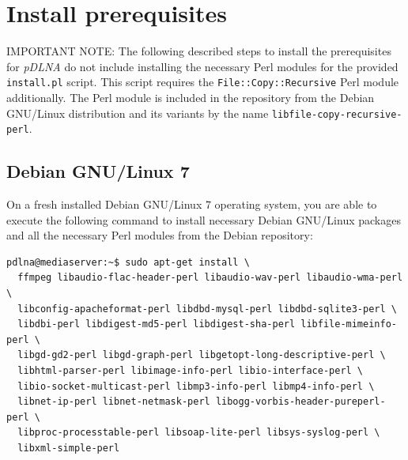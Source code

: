 \documentclass[a4paper,oneside,10pt]{report}
\newenvironment{colframeimportantnote}{%
  \begin{Sbox}
    \begin{minipage}{.99\columnwidth}
}{%
  \end{minipage}
  \end{Sbox}
  \begin{center}
    \fcolorbox{black}{Orange}{\TheSbox}
  \end{center}
}
\begin{document}
\section{Install prerequisites}
\label{install-prerequisites}

\begin{colframeimportantnote}
\textsc{IMPORTANT NOTE:} The following described steps to install the prerequisites for {\em pDLNA} do not include installing the necessary Perl modules for the provided \verb|install.pl| script. This script requires the \verb|File::Copy::Recursive| Perl module additionally. The Perl module is included in the repository from the Debian GNU/Linux distribution and its variants by the name \verb|libfile-copy-recursive-perl|.
\end{colframeimportantnote}

\subsection{Debian GNU/Linux 7}

On a fresh installed Debian GNU/Linux 7 operating system, you are able to execute the following command to install necessary Debian GNU/Linux packages and all the necessary Perl modules from the Debian repository:
\begin{lstlisting}
pdlna@mediaserver:~$ sudo apt-get install \
  ffmpeg libaudio-flac-header-perl libaudio-wav-perl libaudio-wma-perl \
  libconfig-apacheformat-perl libdbd-mysql-perl libdbd-sqlite3-perl \
  libdbi-perl libdigest-md5-perl libdigest-sha-perl libfile-mimeinfo-perl \
  libgd-gd2-perl libgd-graph-perl libgetopt-long-descriptive-perl \
  libhtml-parser-perl libimage-info-perl libio-interface-perl \
  libio-socket-multicast-perl libmp3-info-perl libmp4-info-perl \
  libnet-ip-perl libnet-netmask-perl libogg-vorbis-header-pureperl-perl \
  libproc-processtable-perl libsoap-lite-perl libsys-syslog-perl \
  libxml-simple-perl
\end{lstlisting}
\end{document}
